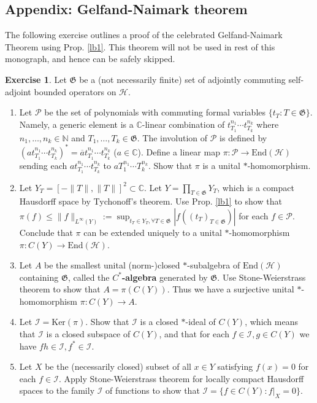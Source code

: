 \documentclass[12pt,a4paper,notitlepage]{article}
\theoremstyle{definition}
\newtheorem{exe}[df]{Exercise}
\theoremstyle{plain}
\newcommand{\fk}{\mathfrak}
\newcommand{\mc}{\mathcal}
\newcommand{\ovl}{\overline}
\newcommand{\End}{\mathrm{End}} %
\newcommand{\Cbb}{\mathbb C}
\newcommand{\Nbb}{\mathbb N}
\newcommand{\Ker}{\mathrm{Ker}}
\numberwithin{equation}{section}
\begin{document}
\subsection*{Appendix: Gelfand-Naimark theorem}

The following exercise outlines a proof of the celebrated Gelfand-Naimark Theorem using Prop. \ref{lb1}. This theorem will not be used in rest of this monograph, and hence can be safely skipped. 

\begin{exe}\label{lb64}
Let $\fk G$ be a (not necessarily finite) set of adjointly commuting self-adjoint bounded operators on $\mc H$. 
\begin{enumerate}
\item Let $\mc P$ be the set of polynomials with commuting  formal variables $\{t_T:T\in\fk G\}$. Namely, a generic element is a $\Cbb$-linear combination of $t_{T_1}^{n_1}\cdots t_{T_k}^{n_k}$ where $n_1,\dots,n_k\in\Nbb$ and $T_1,\dots,T_k\in\fk G$. The involution of $\mc P$ is defined by $(at_{T_1}^{n_1}\cdots t_{T_k}^{n_k})^*=\ovl at_{T_1}^{n_1}\cdots t_{T_k}^{n_k}$ ($a\in\Cbb$). Define a linear map $\pi:\mc P\rightarrow\End(\mc H)$ sending each $at_{T_1}^{n_1}\cdots t_{T_k}^{n_k}$ to $aT_1^{n_1}\cdots T_k^{n_k}$. Show that $\pi$ is a unital $*$-homomorphism. 

\item Let $Y_T=[-\lVert T\lVert,\lVert T\lVert]^2\subset\Cbb$. Let $Y=\prod_{T\in\fk G}Y_T$, which is a compact Hausdorff space by Tychonoff's theorem. Use Prop. \ref{lb1} to show that $\pi(f)\leq \lVert f\lVert_{L^\infty(Y)}:=\sup_{t_T\in Y_T,\forall T\in\fk G}|f((t_T)_{T\in\fk G})|$ for each $f\in\mc P$. Conclude that $\pi$ can be extended uniquely to a unital $*$-homomorphism $\pi:C(Y)\rightarrow\End(\mc H)$. 

\item Let $A$ be the smallest unital (norm-)closed $*$-subalgebra of $\End(\mc H)$ containing $\fk G$, called the \textbf{$C^*$-algebra} generated by $\fk G$. Use Stone-Weierstrass theorem to show that $A=\pi(C(Y))$. Thus we have a surjective unital $*$-homomorphism $\pi:C(Y)\rightarrow A$.


\item Let $\mc I=\Ker(\pi)$. Show that $\mc I$ is a closed $*$-ideal of $C(Y)$, which means that $\mc I$ is a closed subspace of $C(Y)$, and that for each $f\in\mc I,g\in C(Y)$ we have $fh\in\mc I,f^*\in\mc I$.

\item Let $X$ be the (necessarily closed) subset of all $x\in Y$ satisfying $f(x)=0$ for each $f\in\mc I$. Apply Stone-Weierstrass theorem for locally compact Hausdorff spaces to the family $\mc I$ of functions to show that $\mc I=\{f\in C(Y):f|_X=0\}$. 


\end{enumerate}
\end{exe}
\end{document}
